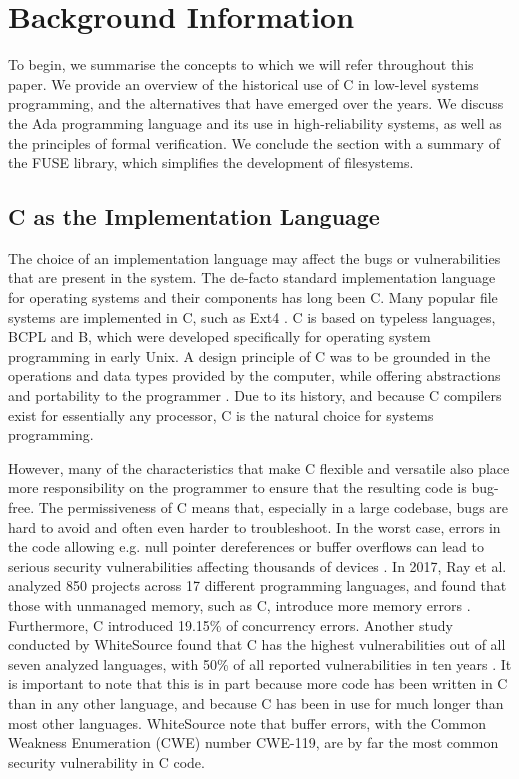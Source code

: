 \section{Background Information}
To begin, we summarise the concepts to which we will refer throughout this paper.
We provide an overview of the historical use of C in low-level systems programming, and the alternatives that have emerged over the years.
We discuss the Ada programming language and its use in high-reliability systems, as well as the principles of formal verification.
We conclude the section with a summary of the FUSE library, which simplifies the development of filesystems.

\subsection{C as the Implementation Language}
The choice of an implementation language may affect the bugs or vulnerabilities that are present in the system.
The de-facto standard implementation language for operating systems and their components has long been C.
Many popular file systems are implemented in C, such as Ext4 \cite{ext4code}.
C is based on typeless languages, BCPL and B, which were developed specifically for operating system programming in early Unix.
A design principle of C was to be grounded in the operations and data types provided by the computer, while offering abstractions and portability to the programmer \cite{ritchie1993}.
Due to its history, and because C compilers exist for essentially any processor, C is the natural choice for systems programming.

However, many of the characteristics that make C flexible and versatile also place more responsibility on the programmer to ensure that the resulting code is bug-free.
The permissiveness of C means that, especially in a large codebase, bugs are hard to avoid and often even harder to troubleshoot.
In the worst case, errors in the code allowing e.g. null pointer dereferences or buffer overflows can lead to serious security vulnerabilities affecting thousands of devices \cite{cert2001}.
In 2017, Ray et al. analyzed 850 projects across 17 different programming languages, and found that those with unmanaged memory, such as C, introduce more memory errors \cite{ray2017}.
Furthermore, C introduced 19.15\% of concurrency errors.
Another study conducted by WhiteSource found that C has the highest vulnerabilities out of all seven analyzed languages, with 50\% of all reported vulnerabilities in ten years \cite{whitesource2019}.
It is important to note that this is in part because more code has been written in C than in any other language, and because C has been in use for much longer than most other languages.
WhiteSource note that buffer errors, with the Common Weakness Enumeration (CWE) number CWE-119, are by far the most common security vulnerability in C code.

